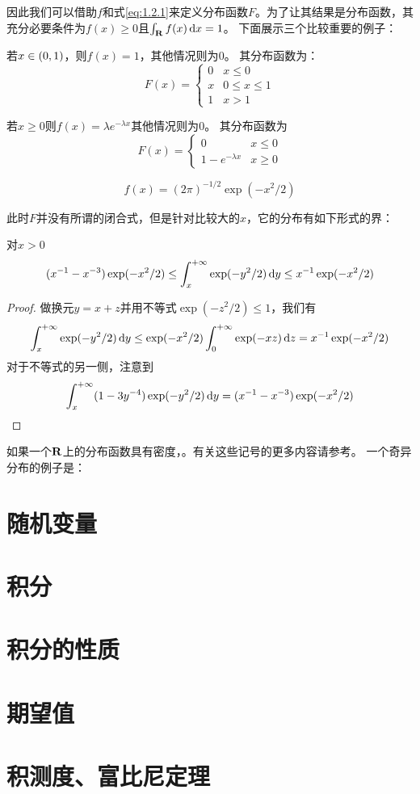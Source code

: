 \documentclass[main.tex]{subfiles}
\begin{document}
因此我们可以借助\(f\)和式\eqref{eq:1.2.1}来定义分布函数\(F\)。为了让其结果是分布函数，其充分必要条件为\(f(x) \geq 0\)且\(\int_\R f(x) \dif x = 1\)。
下面展示三个比较重要的例子：
\begin{example}
	若\(x \in \intoo{0,1}\)，则\(f(x) = 1\)，其他情况则为\(0\)。
	其分布函数为：
	\[F(x) = \begin{cases}
		0&x\leq 0\\
		x&0\leq x\leq 1\\
		1&x>1
	\end{cases}\]
\end{example}
\begin{example}
	若\(x \geq 0\)则\(f(x) = \lambda e^{-\lambda x}\)其他情况则为\(0\)。
	其分布函数为
	\[F(x) = \begin{cases}
		0&x\leq 0\\
		1-e^{-\lambda x}&x \geq 0
	\end{cases}\]
\end{example}
\begin{example}[标准正态分布]
	\[f(x) = (2\pi)^{-1/2}\exp(-x^2/2)\]
\end{example}
此时\(F\)并没有所谓的闭合式，但是针对比较大的\(x\)，它的分布有如下形式的界：
\begin{theorem}
	对\(x > 0\)
	\[(x^{-1} - x^{-3})\exp(-x^2/2) \leq \int_{x}^{+\infty} \exp(-y^2/2) \dif y \leq x^{-1}\exp(-x^2/2)\]
\end{theorem}
\begin{proof}
	做换元\(y=x+z\)并用不等式\(\exp(-z^2/2) \leq 1\)，我们有
	\[\int_{x}^{+\infty} \exp(-y^2/2) \dif y \leq \exp(-x^2/2)\int_{0}^{+\infty}\exp(-xz) \dif z = x^{-1}\exp(-x^2/2)\]
	对于不等式的另一侧，注意到
	\[\int_{x}^{+\infty} (1-3y^{-4})\exp(-y^2/2) \dif y = (x^{-1} - x^{-3})\exp(-x^2/2)\]
\end{proof}
如果一个\(\mathbf{R}\)上的分布函数具有密度，。有关这些记号的更多内容请参考。
一个奇异分布的例子是：
\begin{example}[康托尔集上的均匀分布]\label{ex:1.2.7}

\end{example}
\section{随机变量} \label{sec:1.3}
\section{积分} \label{sec:1.4}
\section{积分的性质} \label{sec:1.5}
\section{期望值} \label{sec:1.6}
\section{积测度、富比尼定理} \label{sec:1.7}
\begin{exercise}
	\item
	\item
	\item
	\item \label{e1.7.4}
\end{exercise}
\end{document}
